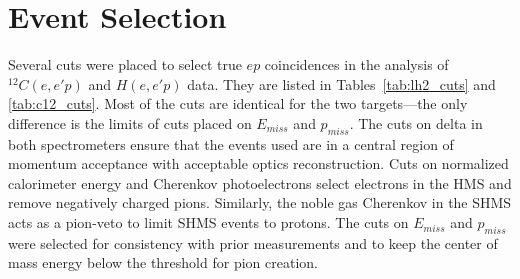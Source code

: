 \section{Event Selection}
Several cuts were placed to select true $ep$ coincidences in the
analysis of ${}^{12}C(e,e'p)$ and $H(e,e'p)$ data.
They are listed in Tables~\ref{tab:lh2_cuts} and \ref{tab:c12_cuts}.
Most of the cuts are identical for the two targets---the only difference is the
limits of cuts placed on $E_{miss}$ and $p_{miss}$.
The cuts on delta in both spectrometers ensure that the events used are in a
central region of momentum acceptance with acceptable optics reconstruction.
Cuts on normalized calorimeter energy and Cherenkov photoelectrons select
electrons in the HMS and remove negatively charged pions.
Similarly, the noble gas Cherenkov in the SHMS acts as a pion-veto to limit
SHMS events to protons.
The cuts on $E_{miss}$ and $p_{miss}$ were selected
for consistency with prior measurements and
to keep the center of mass energy below the threshold for pion creation.

\begin{table}[h]
    \centering
    \caption{List of cuts used to select clean $H(e,e'p)$ events.}
    \label{tab:lh2_cuts}
\end{table}


